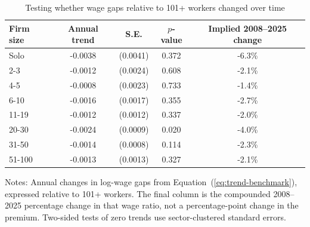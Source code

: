 \begin{table}[htbp]
  \centering
  \caption{Testing whether wage gaps relative to 101+ workers changed over time}
  \label{tab:firm-size-premium-trend-test-101-reference}
  \small
  \begin{tabular}{lcccc}
    \toprule
    Firm size & Annual trend & S.E. & $p$-value & Implied 2008--2025 change \\
    \midrule
    Solo & -0.0038 & (0.0041) & 0.372 & -6.3\% \\
    2-3 & -0.0012 & (0.0024) & 0.608 & -2.1\% \\
    4-5 & -0.0008 & (0.0023) & 0.733 & -1.4\% \\
    6-10 & -0.0016 & (0.0017) & 0.355 & -2.7\% \\
    11-19 & -0.0012 & (0.0012) & 0.337 & -2.0\% \\
    20-30 & -0.0024 & (0.0009) & 0.020 & -4.0\% \\
    31-50 & -0.0014 & (0.0008) & 0.114 & -2.3\% \\
    51-100 & -0.0013 & (0.0013) & 0.327 & -2.1\% \\
    \bottomrule
  \end{tabular}
  \vspace{0.3em}
  \begin{minipage}{0.95\textwidth}
  \footnotesize
  Notes: Annual changes in log-wage gaps from Equation~(\ref{eq:trend-benchmark}), expressed relative to 101+ workers. The final column is the compounded 2008--2025 percentage change in that wage ratio, not a percentage-point change in the premium. Two-sided tests of zero trends use sector-clustered standard errors.
  \end{minipage}
\end{table}
